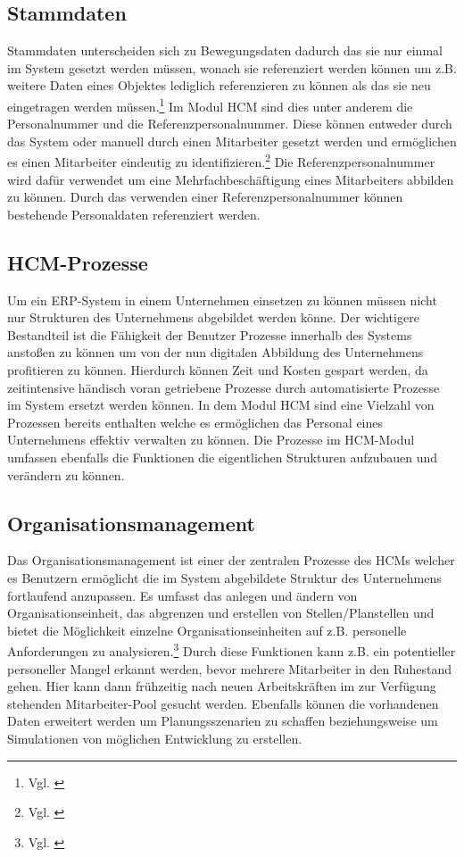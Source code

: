 \subsection{Stammdaten}
Stammdaten unterscheiden sich zu Bewegungsdaten dadurch das sie nur einmal im System gesetzt werden müssen, wonach sie referenziert werden können um z.B. weitere Daten eines Objektes lediglich referenzieren zu können als das sie neu eingetragen werden müssen.\footnote{Vgl. \cite{SSSUM2019a}} Im Modul HCM sind dies unter anderem die Personalnummer und die Referenzpersonalnummer. Diese können entweder durch das System oder manuell durch einen Mitarbeiter gesetzt werden und ermöglichen es einen Mitarbeiter eindeutig zu identifizieren.\footnote{Vgl. \cite{SSSUM2019a}} Die Referenzpersonalnummer wird dafür verwendet um eine Mehrfachbeschäftigung eines Mitarbeiters abbilden zu können. Durch das verwenden einer Referenzpersonalnummer können bestehende Personaldaten referenziert werden. 

\subsection{HCM-Prozesse}
Um ein ERP-System in einem Unternehmen einsetzen zu können müssen nicht nur Strukturen des Unternehmens abgebildet werden könne. Der wichtigere Bestandteil ist die Fähigkeit der Benutzer Prozesse innerhalb des Systems anstoßen zu können um von der nun digitalen Abbildung des Unternehmens profitieren zu können. Hierdurch können Zeit und Kosten gespart werden, da zeitintensive händisch voran getriebene Prozesse durch automatisierte Prozesse im System ersetzt werden können. In dem Modul HCM sind eine Vielzahl von Prozessen bereits enthalten welche es ermöglichen das Personal eines Unternehmens effektiv verwalten zu können. Die Prozesse im HCM-Modul umfassen ebenfalls die Funktionen die eigentlichen Strukturen aufzubauen und verändern zu können. 

\subsection{Organisationsmanagement}
Das Organisationsmanagement ist einer der zentralen Prozesse des HCMs welcher es Benutzern ermöglicht die im System abgebildete Struktur des Unternehmens fortlaufend anzupassen. Es umfasst das anlegen und ändern von Organisationseinheit, das abgrenzen und erstellen von Stellen/Planstellen und bietet die Möglichkeit einzelne Organisationseinheiten auf z.B. personelle Anforderungen zu analysieren.\footnote{Vgl. \cite{SSSUM2019a}} Durch diese Funktionen kann z.B. ein potentieller personeller Mangel erkannt werden, bevor mehrere Mitarbeiter in den Ruhestand gehen. Hier kann dann frühzeitig nach neuen Arbeitskräften im zur Verfügung stehenden Mitarbeiter-Pool gesucht werden. Ebenfalls können die vorhandenen Daten erweitert werden um Planungsszenarien zu schaffen beziehungsweise um Simulationen von möglichen Entwicklung zu erstellen. 

